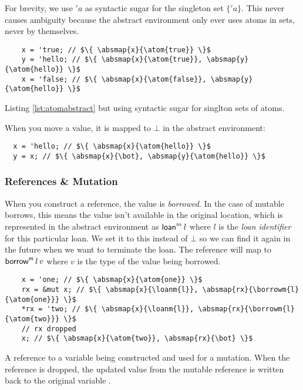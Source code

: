 \documentclass[12pt,twoside]{report}
\begin{document}
For brevity, we use $'a$ as syntactic sugar for the singleton set $\{'a\}$. This never causes ambiguity because the abstract environment only ever uses atoms in sets, never by themselves.

\begin{listing}[H]
  \begin{verbatim}
    x = 'true; // $\{ \absmap{x}{\atom{true}} \}$
    y = 'hello; // $\{ \absmap{x}{\atom{true}}, \absmap{y}{\atom{hello}} \}$
    x = 'false; // $\{ \absmap{x}{\atom{false}}, \absmap{y}{\atom{hello}} \}$
  \end{verbatim}
  \caption{Listing \ref{lst:atomabstract} but using syntactic sugar for singlton sets of atoms.}
\end{listing}

When you move a value, it is mapped to $\bot$ in the abstract environment:

\begin{verbatim}
  x = 'hello; // $\{ \absmap{x}{\atom{hello}} \}$
  y = x; // $\{ \absmap{x}{\bot}, \absmap{y}{\atom{hello}} \}$
\end{verbatim}

\subsubsection{References \& Mutation}

When you construct a reference, the value is \textit{borrowed}. In the case of mutable borrows, this means the value isn't available in the original location, which is represented in the abstract environment as $\mathsf{loan}^m \, l$ where $l$ is the \textit{loan identifier} for this particular loan. We set it to this instead of $\bot$ so we can find it again in the future when we want to terminate the loan. The reference will map to $\mathsf{borrow}^{\mathsf{m}}\,l\,v$ where $v$ is the type of the value being borrowed.

\begin{listing}[H]
  \begin{verbatim}
    x = 'one; // $\{ \absmap{x}{\atom{one}} \}$
    rx = &mut x; // $\{ \absmap{x}{\loanm{l}}, \absmap{rx}{\borrowm{l}{\atom{one}}} \}$
    *rx = 'two; // $\{ \absmap{x}{\loanm{l}}, \absmap{rx}{\borrowm{l}{\atom{two}}} \}$
    // rx dropped
    x; // $\{ \absmap{x}{\atom{two}}, \absmap{rx}{\bot} \}$
  \end{verbatim}
  \caption{A reference to a variable being constructed and used for a mutation. When the reference  is dropped, the updated value from the mutable reference is written back to the original variable .}
\end{listing}
\end{document}
